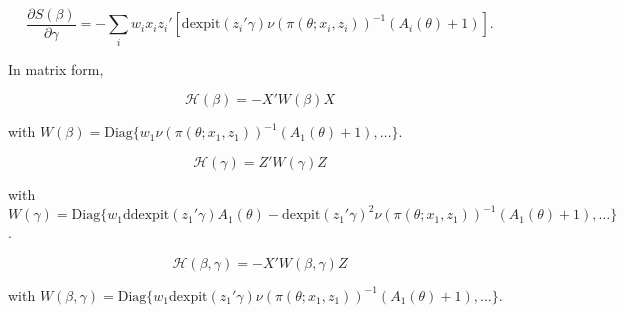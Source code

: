 \documentclass{article}
\begin{document}
\[
\frac{\partial S(\beta)}{\partial \gamma} = - \sum_i w_i x_i z_i' \left[  \mbox{dexpit}(z_i'\gamma) \nu(\pi(\theta;x_i,z_i))^{-1} ( A_i(\theta) + 1 ) \right].
\]

\noindent In matrix form,

\[
\mathcal{H}(\beta) = - X' W(\beta) X
\] 

\noindent with $W(\beta) = \mbox{Diag}\lbrace w_1 \nu(\pi(\theta;x_1,z_1))^{-1} ( A_1(\theta) + 1 ),\dots\rbrace$.

\[
\mathcal{H}(\gamma) =  Z' W(\gamma) Z
\] 

\noindent with $W(\gamma) = \mbox{Diag}\lbrace w_1 \mbox{ddexpit}(z_1'\gamma) A_1(\theta) -\mbox{dexpit}(z_1'\gamma)^2 \nu(\pi(\theta;x_1,z_1))^{-1} ( A_1(\theta) + 1 ),\dots \rbrace$.

\[
\mathcal{H}(\beta,\gamma) =  -X' W(\beta,\gamma) Z
\] 

\noindent with $W(\beta,\gamma) = \mbox{Diag}\lbrace w_1 \mbox{dexpit}(z_1'\gamma) \nu(\pi(\theta;x_1,z_1))^{-1} ( A_1(\theta) + 1 ),\dots\rbrace$.
\end{document}
